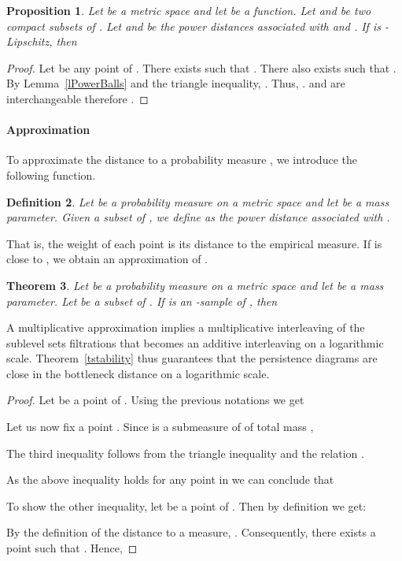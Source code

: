\documentclass[a4paper]{article}
\newtheorem{theorem}{Theorem}[section]
\newtheorem{definition}[theorem]{Definition}
\newtheorem{proposition}[theorem]{Proposition}
\begin{document}
  \begin{proposition}\label{pPowerBalls}
    Let  be a metric space and let  be a function.
    Let  and  be two compact subsets of .
    Let  and  be the power distances associated with  and .
    If  is -Lipschitz, then
    
  \end{proposition}
  \begin{proof}
    Let  be any point of .
    There exists  such that .
    There also exists  such that .
    By Lemma~\ref{lPowerBalls} and the triangle inequality, .
    Thus, .
     and  are interchangeable therefore .
\end{proof}

\paragraph{Approximation\\}
To approximate the distance to a probability measure , we introduce the following function.

\begin{definition}\label{dDpd}
  Let  be a probability measure on a metric space  and let  be a mass parameter.
  Given a subset  of , we define  as the power distance associated with .
  
\end{definition}
That is, the weight of each point is its distance to the empirical measure.
If  is close to , we obtain an approximation of .

\begin{theorem}\label{tPbound}
Let  be a probability measure on a metric space  and let  be a mass parameter.
Let  be a subset of .
If  is an -sample of , then

\end{theorem}

A multiplicative approximation implies a multiplicative interleaving of the sublevel sets filtrations that becomes an additive interleaving on a logarithmic scale.
Theorem~\ref{tstability} thus guarantees that the persistence diagrams are close in the bottleneck distance on a logarithmic scale.

\begin{proof}
Let  be a point of . 
Using the previous notations we get

Let us now fix a point .
Since  is a submeasure of  of total mass ,

The third inequality follows from the triangle inequality and the relation .

As the above inequality holds for any point  in  we can conclude that


To show the other inequality, let  be a point of .
Then by definition we get:

By the definition of the distance to a measure, .
Consequently, there exists a point  such that .
Hence,

\end{proof}
\end{document}
